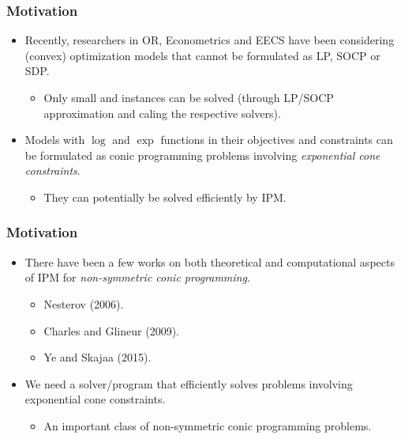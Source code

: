 \documentclass{beamer}
\begin{document}
\begin{frame}
	\frametitle{Motivation}
	\begin{itemize}
		\item Recently, researchers in OR, Econometrics and EECS have been considering (convex) optimization models that cannot be formulated as LP, SOCP or SDP.
		\begin{itemize}
			\item Only small and  instances can be solved (through LP/SOCP approximation and caling the respective solvers).
		\end{itemize}
		\item Models with $\log$ and $\exp$ functions in their objectives and constraints can be formulated as conic programming problems involving \textit{exponential cone constraints}.
		\begin{itemize}
			\item They can potentially be solved efficiently by IPM.
		\end{itemize}
	\end{itemize}
\end{frame}

\begin{frame}
	\frametitle{Motivation}
	\begin{itemize}
		\item There have been a few works on both theoretical and computational aspects of IPM for \textit{non-symmetric conic programming}.
		\begin{itemize}
			\item Nesterov (2006).
			\item Charles and Glineur (2009).
			\item Ye and Skajaa (2015).
		\end{itemize}
		\item We need a solver/program that efficiently solves problems involving exponential cone constraints.
		\begin{itemize}
			\item An important class of non-symmetric conic programming problems.
		\end{itemize}
	\end{itemize}
\end{frame}
\end{document}
